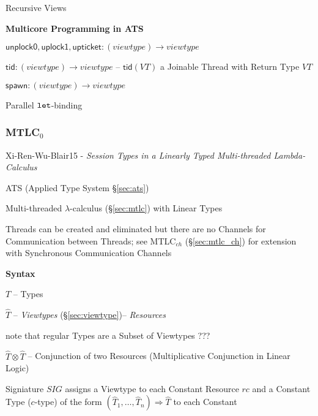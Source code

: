 Recursive Views


\textbf{Multicore Programming in ATS}

$\mathsf{unplock0, uplock1, upticket} : (viewtype) \rightarrow
viewtype$

$\mathsf{tid} : (viewtype) \rightarrow viewtype$ -- $\mathsf{tid}(VT)$
a Joinable Thread with Return Type $VT$

$\mathsf{spawn} : (viewtype) \rightarrow viewtype$

Parallel $\mathtt{let}$-binding %



\subsubsection{MTLC$_0$}\label{sec:mtlc_0}

\begingroup

\renewcommand{\Unit}{\mathbf{1}}
\newcommand{\bool}{\mathsf{bool}}
\newcommand{\Bool}{\mathsf{Bool}}
\newcommand{\Choose}{\mathsf{Choose}}
\newcommand{\Nil}{\mathsf{Nil}}
\newcommand{\Send}{\mathsf{Send}}
\newcommand{\Recv}{\mathsf{Recv}}
\newcommand{\Service}{\mathsf{Service}}
\newcommand{\chpos}{\mathbf{chpos}}
\newcommand{\chneg}{\mathbf{chneg}}

Xi-Ren-Wu-Blair15 - \emph{Session Types in a Linearly Typed
  Multi-threaded Lambda-Calculus}

\fist ATS (Applied Type System \S\ref{sec:ats})

Multi-threaded $\lambda$-calculus (\S\ref{sec:mtlc}) with Linear Types

Threads can be created and eliminated but there are no Channels for
Communication between Threads; see MTLC$_{ch}$ (\S\ref{sec:mtlc_ch})
for extension with Synchronous Communication Channels


\textbf{Syntax}


$T$ -- Types

$\hat{T}$ -- \emph{Viewtypes} (\S\ref{sec:viewtype})--
\emph{Resources}

note that regular Types are a Subset of Viewtypes ??? %

$\hat{T} \otimes \hat{T}$ -- Conjunction of two Resources
(Multiplicative Conjunction in Linear Logic)

Signiature $SIG$ assigns a Viewtype to each Constant Resource $rc$ and
a Constant Type ($c$-type) of the form $(\hat{T}_1, \ldots, \hat{T}_n)
\Rightarrow \hat{T}$ to each Constant

